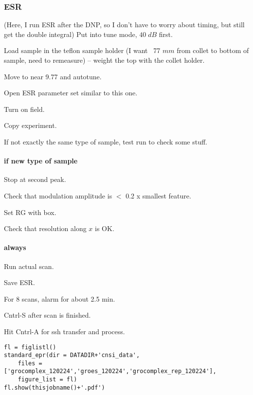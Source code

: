 \subsubsection{ESR}

(Here, I run ESR after the DNP, so I don't have to worry about timing, but still get the double integral)
Put into tune mode, $40\;dB$ first.

Load sample in the teflon sample holder (I want ~77 $mm$ from collet to bottom of sample, need to remeasure) -- weight the top with the collet holder.

Move to near 9.77 and autotune.

Open ESR parameter set similar to this one.

Turn on field.

Copy experiment.

If not exactly the same type of sample, test run to check some stuff.


\paragraph{if new type of sample}
Stop at second peak.

Check that modulation amplitude is $<$ 0.2 x smallest feature.

Set RG with box.

Check that resolution along $x$ is OK.

\paragraph{always}

Run actual scan.

Save ESR.

For 8 scans, alarm for about 2.5 min.

Cntrl-S after scan is finished.

Hit Cntrl-A for ssh transfer and process.


\begin{tiny}
\begin{lstlisting}
fl = figlistl()
standard_epr(dir = DATADIR+'cnsi_data',
    files = ['grocomplex_120224','groes_120224','grocomplex_rep_120224'],
    figure_list = fl)
fl.show(thisjobname()+'.pdf')
\end{lstlisting}
\end{tiny}

